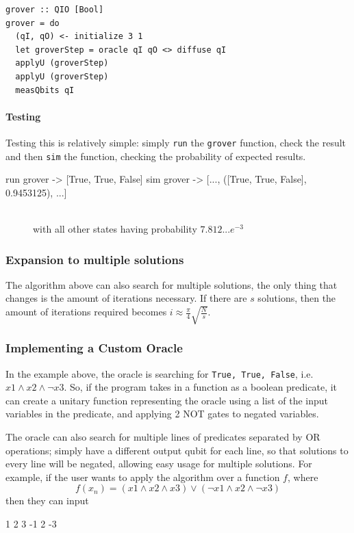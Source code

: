 \documentclass[a4paper,10pt, titlepage, twoside]{article}
\begin{document}
\begin{verbatim}
grover :: QIO [Bool]
grover = do
  (qI, qO) <- initialize 3 1
  let groverStep = oracle qI qO <> diffuse qI
  applyU (groverStep)
  applyU (groverStep)
  measQbits qI  
\end{verbatim}

\paragraph{Testing}
Testing this is relatively simple: simply \texttt{run} the \texttt{grover} function, check the result and then \texttt{sim} the function, checking the probability of expected results.\par
\begin{verbbox}
run grover -> [True, True, False]
sim grover -> [..., ([True, True, False], 0.9453125), ...]
\end{verbbox}

\begin{figure}[H]
    \centering
    \theverbbox \\
    with all other states having probability $7.812...e^{-3}$
\end{figure}

\subsubsection{Expansion to multiple solutions}
The algorithm above can also search for multiple solutions, the only thing that changes is the amount of iterations necessary. If there are $s$ solutions, then the amount of iterations required becomes $i \approx \frac{\pi}{4} \sqrt{\frac{N}{s}}$.\par

\subsubsection{Implementing a Custom Oracle}
In the example above, the oracle is searching for \texttt{True, True, False}, i.e. $x1 \land x2 \land \neg x3$. So, if the program takes in a function as a boolean predicate, it can create a unitary function representing the oracle using a list of the input variables in the predicate, and applying 2 NOT gates to negated variables.\par
The oracle can also search for multiple lines of predicates separated by OR operations; simply have a different output qubit for each line, so that solutions to every line will be negated, allowing easy usage for multiple solutions. For example, if the user wants to apply the algorithm over a function $f$, where
$$f(x_n) = (x1 \land x2 \land x3) \lor (\neg x1 \land x2 \land \neg x3)$$
then they can input\par
\begin{verbbox}
1 2 3
-1 2 -3
\end{verbbox}
\begin{figure}[H]
    \centering
    \theverbbox
\end{figure}
\end{document}
